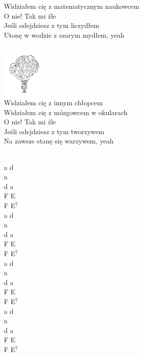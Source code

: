\documentclass[a5paper, 10pt]{book}
\begin{document}
\begin{minipage}[t]{0.85\textwidth}
Widziałem cię z matematycznym naukowcem\\
O nie! Tak mi źle\\
Jeśli odejdziesz z tym liczydłem\\
Utonę w wodzie z szarym mydłem, yeah\\
\\
\includegraphics[height=2.5cm, right]{widzialem_cie_4.png}\vspace*{-2.6cm}\\
Widziałem cię z innym chłopcem\\
Widziałem cię z mózgowcem w okularach\\
O nie! Tak mi źle\\
Jeśli odejdziesz z tym tworzywem\\
Na zawsze stanę się warzywem, yeah\\
\end{minipage}
\begin{minipage}[t]{0.15\textwidth}
~\\
a d\\
a\\
d a\\
F E\\
F E$^7$\\

a d\\
a\\
d a\\
F E\\
F E$^7$\\

a d\\
a\\
d a\\
F E\\
F E$^7$\\

a d\\
a\\
d a\\
F E\\
F E$^7$\\
\end{minipage}

\newpage
\end{document}
